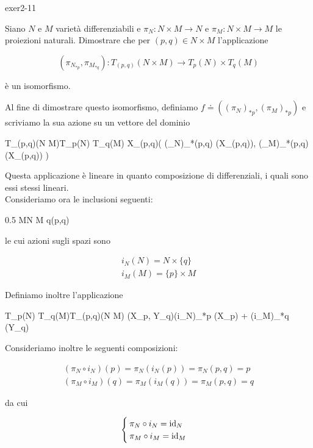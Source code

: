 {exer2-11}
{
Siano $ N $ e $ M $ varietà differenziabili e $ \pi_{N} : N \times M \to N $ e $ \pi_{M} : N \times M \to M $ le proiezioni naturali. Dimostrare che per $ (p,q) \in N \times M $ l'applicazione

\begin{equation}
	(\pi_{N_{*p}},\pi_{M_{*q}}) : T_{(p,q)}(N \times M) \to T_{p}(N) \times T_{q}(M)
\end{equation}

è un isomorfismo.
}
{

Al fine di dimostrare questo isomorfismo, definiamo $ f \doteq \left( (\pi_{N})_{*p},(\pi_{M})_{*p} \right) $ e scriviamo la sua azione su un vettore del dominio

	{T_{(p,q)}(N \times M)}{T_{p}(N) \times T_{q}(M)}
	{X_{(p,q)}}{\left( (\pi_{N})_{*(p,q)} (X_{(p,q)}), (\pi_{M})_{*(p,q)} (X_{(p,q)}) \right)}

Questa applicazione è lineare in quanto composizione di differenziali, i quali sono essi stessi lineari. \\
Consideriamo ora le inclusioni seguenti:

	{0.5}{%
				{M}{N \times M}
				{q}{(p,q)}
			}

le cui azioni sugli spazi sono

\begin{gather}
	i_{N}(N) = N \times \{q\} \\
	i_{M}(M) = \{p\} \times M
\end{gather}

Definiamo inoltre l'applicazione

	{T_{p}(N) \times T_{q}(M)}{T_{(p,q)}(N \times M)}
	{(X_{p}, Y_{q})}{(i_{N})_{*p} (X_{p}) + (i_{M})_{*q} (Y_{q})}

Consideriamo inoltre le seguenti composizioni:

\begin{gather}
	(\pi_{N} \circ i_{N}) (p) = \pi_{N} (i_{N} (p)) = \pi_{N} (p,q) = p \\
	(\pi_{M} \circ i_{M}) (q) = \pi_{M} (i_{M} (q)) = \pi_{M} (p,q) = q
\end{gather}

da cui

\begin{equation}
	\begin{cases}
		\pi_{N} \circ i_{N} = \operatorname{id}_{N} \\
		\pi_{M} \circ i_{M} = \operatorname{id}_{M}
	\end{cases}
\end{equation}

}
